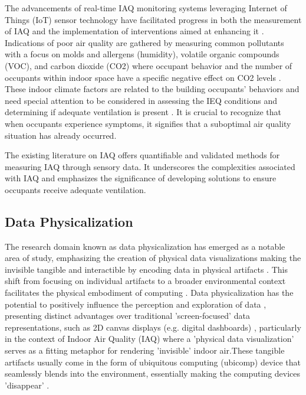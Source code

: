 The advancements of real-time IAQ monitoring systems leveraging Internet of Things (IoT) sensor technology have facilitated progress in both the measurement of IAQ and the implementation of interventions aimed at enhancing it \cite{pantelic_transformational_2022}. Indications of poor air quality are gathered by measuring common pollutants with a focus on molds and allergens (humidity), volatile organic compounds (VOC), and carbon dioxide (CO2) \cite{klepeis_national_2001} where occupant behavior and the number of occupants within indoor space have a specific negative effect on CO2 levels \cite{fromme_indoor_2023}. These indoor climate factors are related to the building occupants’ behaviors and need special attention to be considered in assessing the IEQ conditions and determining if adequate ventilation is present \cite{du_indoor_2020}. It is crucial to recognize that when occupants experience symptoms, it signifies that a suboptimal air quality situation has already occurred.

The existing literature on IAQ offers quantifiable and validated methods for measuring IAQ through sensory data. It underscores the complexities associated with IAQ and emphasizes the significance of developing solutions to ensure occupants receive adequate ventilation.


\subsection{Data Physicalization}
\label{sec:phys}

The research domain known as data physicalization \cite{alexander_data_2019, jansen_opportunities_2015} has emerged as a notable area of study, emphasizing the creation of physical data visualizations making the invisible tangible and interactible by encoding data in physical artifacts \cite{ranasinghe_encoding_2023}. This shift from focusing on individual artifacts to a broader environmental context facilitates the physical embodiment of computing \cite{dragicevic_data_2020}. Data physicalization has the potential to positively influence the perception and exploration of data \cite{jansen_opportunities_2015, wang_emotional_2019, stusak_evaluating_2015}, presenting distinct advantages over traditional 'screen-focused' data representations, such as 2D canvas displays (e.g. digital dashboards) \cite{hornecker_design_2023, jansen_evaluating_2013}, particularly in the context of Indoor Air Quality (IAQ) where a 'physical data visualization' serves as a fitting metaphor for rendering 'invisible' indoor air.These tangible artifacts usually come in the form of ubiquitous computing (ubicomp) \cite{bell_yesterdays_2007} device that seamlessly blends into the environment, essentially making the computing devices 'disappear' \cite{weiser_computer_1999}. 

